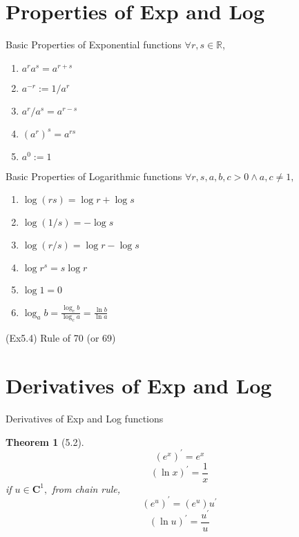 \documentclass[a4paper,11pt]{article}
\newtheorem{thm}{Theorem}
\begin{document}
\section{Properties of Exp and Log} %
\label{sec:properties_of_exp_and_log}
\begin{frame}[t]{Basic Properties of Exponential functions}
	$\forall r,s \in \mathbb{R}$,
	\begin{enumerate}
		\item $a^r a^s = a^{r+s}$
		\item $a^{-r} := 1/a^r$
		\item $a^r/a^s = a^{r-s}$
		\item $(a^r)^s=a^{rs}$
		\item $a^0 := 1$
	\end{enumerate}

\end{frame}



\begin{frame}[t]{Basic Properties of Logarithmic functions}
	$\forall r,s,a,b,c >0 \land a,c\neq 1,$
	\begin{enumerate}
		\item $\log(rs)=\log r + \log s$
		\item $\log(1/s)=-\log s$
		\item $\log(r/s) = \log r - \log s$
		\item $\log r^s = s\log r$
		\item $\log 1 = 0$
		\item $\log_a b = \frac{\log_c b }{\log_c a}= \frac{\ln b}{\ln a}$
	\end{enumerate}
	
(Ex5.4) Rule of 70 (or 69)
\end{frame}
	
\section{Derivatives of Exp and Log} %
\label{sec:derivatives_of_exp_and_log}
\begin{frame}[t]{Derivatives of Exp and Log functions}
	\begin{thm}
		[5.2]
		\[
			(e^x)^\prime = e^x
		\]\[
			(\ln x)^\prime = \frac 1 x 
		\]if $u\in \mathbf{C}^1,$ from chain rule,\[
			\left(e^{u}\right)^\prime = \left(e^{u}\right)u^\prime
		\]\[
			(\ln u )^\prime = \frac {u^\prime} {u }\tag{$u>0$}
		\]
	\end{thm}
\end{frame}
\end{document}
